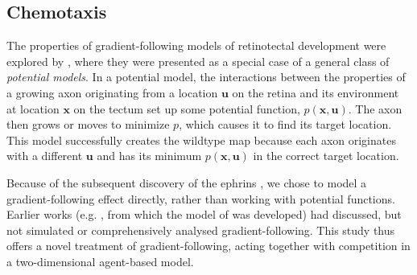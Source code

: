 \documentclass[9pt,lineno,draft]{elife}
\begin{document}
\subsection*{Chemotaxis}

The properties of gradient-following models of retinotectal development were explored by \citet{gierer_development_1981,gierer_model_1983,gierer_directional_1987}, where they were presented as a special case of a general class of \emph{potential models}.
In a potential model, the interactions between the properties of a growing axon originating from a location $\mathbf{u}$ on the retina and its environment at location $\mathbf{x}$ on the tectum set up some potential function, $p(\mathbf{x},\mathbf{u})$.
The axon then grows or moves to minimize $p$, which causes it to find its target location. This model successfully creates the wildtype map because each axon originates with a different $\mathbf{u}$ and has its minimum $p(\mathbf{x},\mathbf{u})$ in the correct target location.

Because of the subsequent discovery of the ephrins \citep{cheng_complementary_1995,drescher_vitro_1995}, we chose to model a gradient-following effect directly, rather than working with potential functions.
Earlier works (e.g. \citet{hope_arrow_1976}, from which the model of \citet{simpson_simple_2011} was developed) had discussed, but not simulated or comprehensively analysed gradient-following.
This study thus offers a novel treatment of gradient-following, acting together with competition in a two-dimensional agent-based model.
\end{document}
